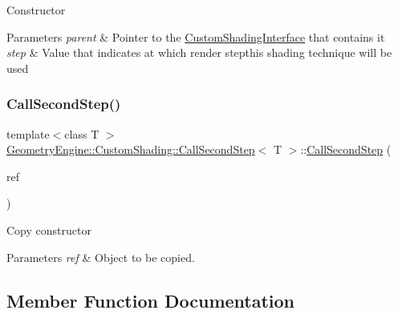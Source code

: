 Constructor 
\begin{DoxyParams}{Parameters}
{\em parent} & Pointer to the \mbox{\hyperlink{class_geometry_engine_1_1_custom_shading_1_1_custom_shading_interface}{Custom\+Shading\+Interface}} that contains it \\
\hline
{\em step} & Value that indicates at which render stepthis shading technique will be used \\
\hline
\end{DoxyParams}
\mbox{\label{class_geometry_engine_1_1_custom_shading_1_1_call_second_step_a7ee78b6a2c0d3cf710ed6f136445eac8}} 
\subsubsection{\texorpdfstring{CallSecondStep()}{CallSecondStep()}\hspace{0.1cm}{\footnotesize\ttfamily [2/2]}}
{\footnotesize\ttfamily template$<$class T $>$ \\
\mbox{\hyperlink{class_geometry_engine_1_1_custom_shading_1_1_call_second_step}{Geometry\+Engine\+::\+Custom\+Shading\+::\+Call\+Second\+Step}}$<$ T $>$\+::\mbox{\hyperlink{class_geometry_engine_1_1_custom_shading_1_1_call_second_step}{Call\+Second\+Step}} (\begin{DoxyParamCaption}\item[{const \mbox{\hyperlink{class_geometry_engine_1_1_custom_shading_1_1_custom_post_process_step}{Custom\+Post\+Process\+Step}} \&}]{ref }\end{DoxyParamCaption})\hspace{0.3cm}{\ttfamily [inline]}}

Copy constructor 
\begin{DoxyParams}{Parameters}
{\em ref} & Object to be copied. \\
\hline
\end{DoxyParams}


\subsection{Member Function Documentation}
\mbox{\label{class_geometry_engine_1_1_custom_shading_1_1_call_second_step_af671ca1fc8a0aa5e35309603ddb7da19}} 
